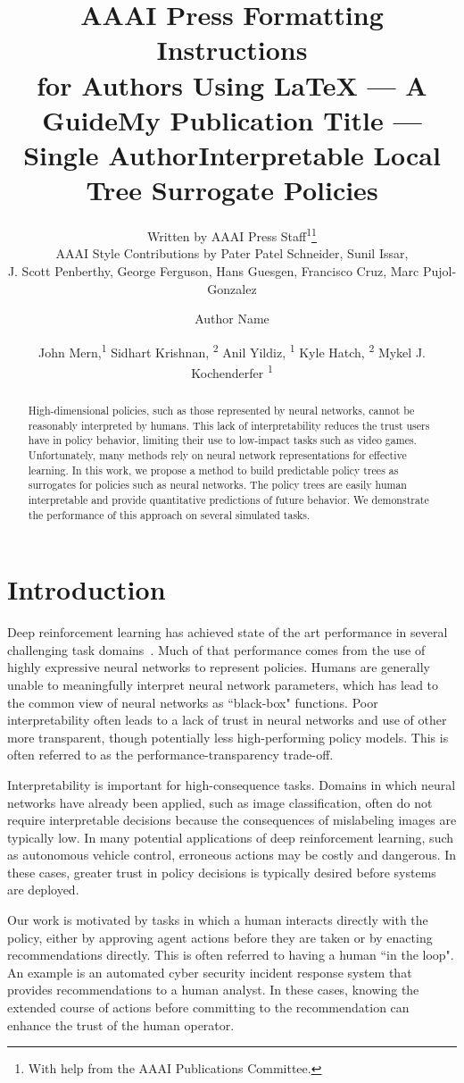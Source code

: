 \documentclass[letterpaper]{article} %
\title{AAAI Press Formatting Instructions \\for Authors Using \LaTeX{} --- A Guide}
\author{
    Written by AAAI Press Staff\textsuperscript{\rm 1}\thanks{With help from the AAAI Publications Committee.}\\
    AAAI Style Contributions by Pater Patel Schneider,
    Sunil Issar,\\
    J. Scott Penberthy,
    George Ferguson,
    Hans Guesgen,
    Francisco Cruz\equalcontrib,
    Marc Pujol-Gonzalez\equalcontrib
}
\title{My Publication Title --- Single Author}
\author {
    Author Name
}
\title{Interpretable Local Tree Surrogate Policies}
\author {
    John Mern,\textsuperscript{\rm 1}
    Sidhart Krishnan, \textsuperscript{\rm 2}
    Anil Yildiz, \textsuperscript{\rm 1}
    Kyle Hatch, \textsuperscript{\rm 2}
    Mykel J. Kochenderfer \textsuperscript{\rm 1}
}
\begin{document}
\maketitle
\begin{abstract}
High-dimensional policies, such as those represented by neural networks, cannot be reasonably interpreted by humans.
This lack of interpretability reduces the trust users have in policy behavior, limiting their use to low-impact tasks such as video games.
Unfortunately, many methods rely on neural network representations for effective learning.
In this work, we propose a method to build predictable policy trees as surrogates for policies such as neural networks.
The policy trees are easily human interpretable and provide quantitative predictions of future behavior.
We demonstrate the performance of this approach on several simulated tasks.
\end{abstract}
\section{Introduction}

Deep reinforcement learning has achieved state of the art performance in several challenging task domains~\cite{mnih2015}.
Much of that performance comes from the use of highly expressive neural networks to represent policies.
Humans are generally unable to meaningfully interpret neural network parameters, which has lead to the common view of neural networks as ``black-box" functions.
Poor interpretability often leads to a lack of trust in neural networks and use of other more transparent, though potentially less high-performing policy models.
This is often referred to as the performance-transparency trade-off. %

Interpretability is important for high-consequence tasks.
Domains in which neural networks have already been applied, such as image classification, often do not require interpretable decisions because the consequences of mislabeling images are typically low.
In many potential applications of deep reinforcement learning, such as autonomous vehicle control, erroneous actions may be costly and dangerous.
In these cases, greater trust in policy decisions is typically desired before systems are deployed.

Our work is motivated by tasks in which a human interacts directly with the policy, either by approving agent actions before they are taken or by enacting recommendations directly.
This is often referred to having a human ``in the loop".
An example is an automated cyber security incident response system that provides recommendations to a human analyst.
In these cases, knowing the extended course of actions before committing to the recommendation can enhance the trust of the human operator.
\end{document}
